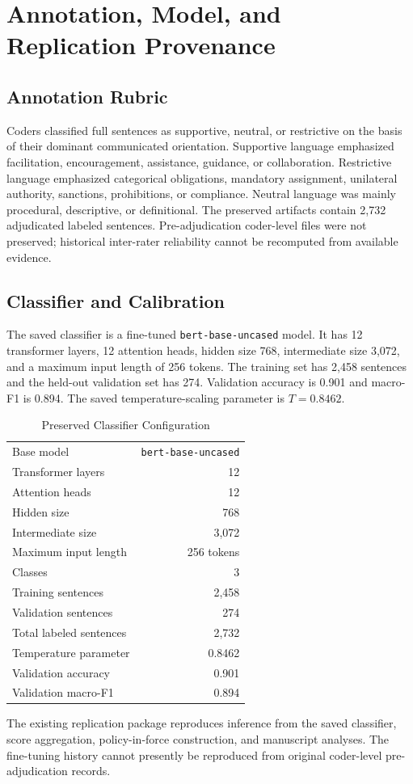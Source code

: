 \documentclass[11pt]{article}
\begin{document}
\section{Annotation, Model, and Replication Provenance}
\subsection{Annotation Rubric}
Coders classified full sentences as supportive, neutral, or restrictive on the basis of their dominant communicated orientation. Supportive language emphasized facilitation, encouragement, assistance, guidance, or collaboration. Restrictive language emphasized categorical obligations, mandatory assignment, unilateral authority, sanctions, prohibitions, or compliance. Neutral language was mainly procedural, descriptive, or definitional. The preserved artifacts contain 2,732 adjudicated labeled sentences. Pre-adjudication coder-level files were not preserved; historical inter-rater reliability cannot be recomputed from available evidence.
\subsection{Classifier and Calibration}
The saved classifier is a fine-tuned \texttt{bert-base-uncased} model. It has 12 transformer layers, 12 attention heads, hidden size 768, intermediate size 3,072, and a maximum input length of 256 tokens. The training set has 2,458 sentences and the held-out validation set has 274. Validation accuracy is 0.901 and macro-F1 is 0.894. The saved temperature-scaling parameter is $T=0.8462$.
\begin{table}[htbp]\centering\caption{Preserved Classifier Configuration}\begin{tabular}{lr}\toprule Base model&\texttt{bert-base-uncased}\\Transformer layers&12\\Attention heads&12\\Hidden size&768\\Intermediate size&3,072\\Maximum input length&256 tokens\\Classes&3\\Training sentences&2,458\\Validation sentences&274\\Total labeled sentences&2,732\\Temperature parameter&0.8462\\Validation accuracy&0.901\\Validation macro-F1&0.894\\\bottomrule\end{tabular}\end{table}
The existing replication package reproduces inference from the saved classifier, score aggregation, policy-in-force construction, and manuscript analyses. The fine-tuning history cannot presently be reproduced from original coder-level pre-adjudication records.
\end{document}
